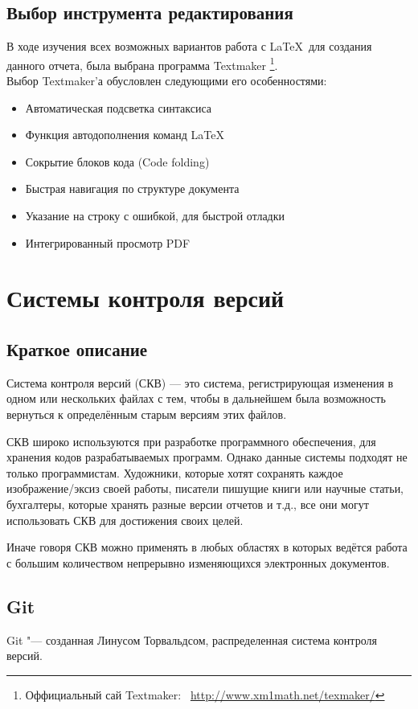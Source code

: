\documentclass{article}
\begin{document}
		\subsection{Выбор инструмента редактирования}
			В ходе изучения всех возможных вариантов работа с \LaTeX ~для создания данного отчета, была выбрана программа 						Textmaker
			\footnote{Оффициальный сай Textmaker:~ \href{http://www.xm1math.net/texmaker/}{http://www.xm1math.net/texmaker/}}.\\
			Выбор Textmaker'а обусловлен следующими его особенностями:
			\begin{itemize} 
	    		\item	Автоматическая подсветка синтаксиса
	    		\item	Функция автодополнения команд \LaTeX
	    		\item	Сокрытие блоков кода (Code folding)
	    		\item	Быстрая навигация по структуре документа
	    		\item	Указание на строку с ошибкой, для быстрой отладки
	    		\item	Интегрированный просмотр PDF
			\end{itemize} 
	\newpage
	\section{Системы контроля версий}
		\subsection{Краткое описание}
			Система контроля версий (СКВ) — это система, регистрирующая изменения в одном или нескольких файлах с тем, чтобы в 				дальнейшем была возможность вернуться к определённым старым версиям этих файлов. 
				
			СКВ широко используются при разработке программного обеспечения, для хранения кодов разрабатываемых программ. Однако 			данные системы подходят не только программистам. Художники, которые хотят сохранять каждое изображение/эксиз своей 					работы, писатели пишущие книги или научные статьи, бухгалтеры, которые хранять разные версии отчетов и т.д., все они 				могут использовать СКВ для достижения своих целей.
				
			Иначе говоря СКВ можно применять в любых областях в которых ведётся работа с большим количеством непрерывно 					изменяющихся электронных документов.
		\subsection{Git}
			Git "--- созданная Линусом Торвальдсом, распределенная система контроля версий.
\end{document}
